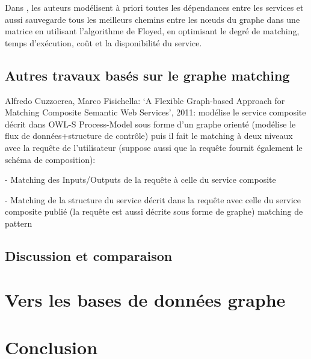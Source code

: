   \begin{text}
     Dans \cite{elmaghraoui2011graph}, les auteurs modélisent à priori
     toutes les dépendances entre les services et aussi sauvegarde
     tous les meilleurs chemins entre les nœuds du graphe dans une
     matrice en utilisant l'algorithme de Floyed, en optimisant le
     degré de matching, temps d'exécution, coût et la disponibilité du
     service.
  \end{text}

  \subsection{Autres travaux basés sur le graphe matching}
  \label{sec:autres-travaux}
  Alfredo Cuzzocrea, Marco Fisichella: ‘A Flexible Graph-based
  Approach for Matching Composite Semantic Web Services’, 2011:
  modélise le service composite décrit dans OWL-S Process-Model sous
  forme d’un graphe orienté (modélise le flux de données+structure de
  contrôle) puis il fait le matching à deux niveaux avec la requête de
  l’utilisateur (suppose aussi que la requête fournit également le
  schéma de composition):

  - Matching des Inputs/Outputs de la requête
  à celle du service composite

  - Matching de la structure du service décrit dans la requête avec
  celle du service composite publié (la requête est aussi décrite sous
  forme de graphe) matching de pattern
  \newpage
  \subsection{Discussion et comparaison}
  \label{sec:discussion-comparaison}

  
\newpage
\section{Vers les bases de données graphe}
\label{sec:vers-les-bases}

\section{Conclusion}
\label{sec:conclusion-2}


